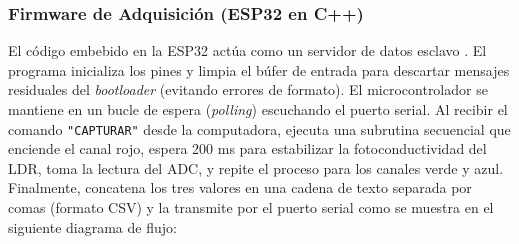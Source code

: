 \documentclass[conference]{IEEEtran}
\begin{document}
\subsubsection{Firmware de Adquisición (ESP32 en C++)}
El código embebido en la ESP32 actúa como un servidor de datos esclavo \cite{ldr_14}. El programa inicializa los pines y limpia el búfer de entrada para descartar mensajes residuales del \textit{bootloader} (evitando errores de formato). El microcontrolador se mantiene en un bucle de espera (\textit{polling}) escuchando el puerto serial. Al recibir el comando \texttt{"CAPTURAR"} desde la computadora, ejecuta una subrutina secuencial que enciende el canal rojo, espera 200 ms para estabilizar la fotoconductividad del LDR, toma la lectura del ADC, y repite el proceso para los canales verde y azul. Finalmente, concatena los tres valores en una cadena de texto separada por comas (formato CSV) y la transmite por el puerto serial como se muestra en el siguiente diagrama de flujo:
\end{document}
